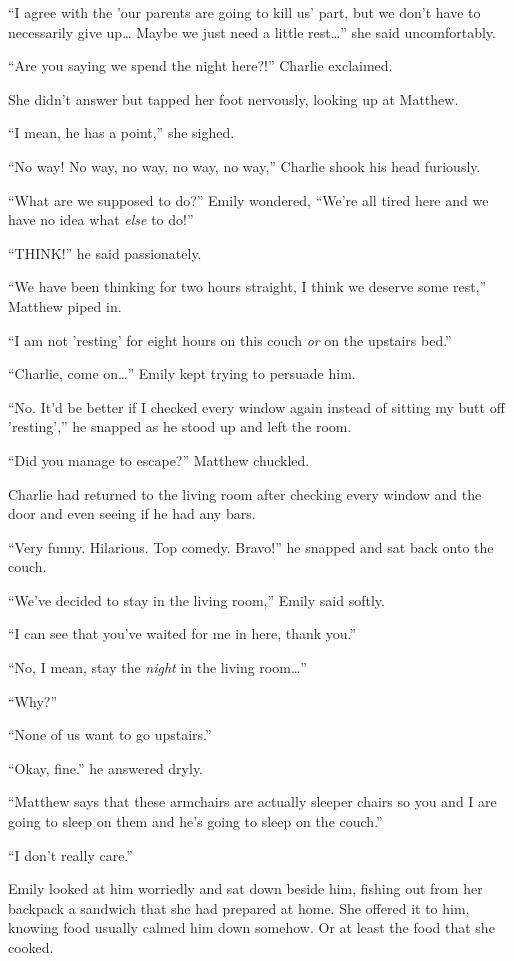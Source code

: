 “I agree with the 'our parents are going to kill us' part, but we don't have to necessarily give up… Maybe we just need a little rest…” she said uncomfortably.

“Are you saying we spend the night here?!” Charlie exclaimed.

She didn't answer but tapped her foot nervously, looking up at Matthew.

“I mean, he has a point,” she sighed.

“No way! No way, no way, no way, no way,” Charlie shook his head furiously.

“What are we supposed to do?” Emily wondered, “We're all tired here and we have no idea what \textit{else} to do!”

“THINK!” he said passionately.

“We have been thinking for two hours straight, I think we deserve some rest,” Matthew piped in.

“I am not 'resting' for eight hours on this couch \textit{or} on the upstairs bed.”

“Charlie, come on…” Emily kept trying to persuade him.

“No. It'd be better if I checked every window again instead of sitting my butt off 'resting',” he snapped as he stood up and left the room.

\bigskip

“Did you manage to escape?” Matthew chuckled.

Charlie had returned to the living room after checking every window and the door and even seeing if he had any bars.

“Very funny. Hilarious. Top comedy. Bravo!” he snapped and sat back onto the couch.

“We've decided to stay in the living room,” Emily said softly.

“I can see that you've waited for me in here, thank you.”

“No, I mean, stay the \textit{night} in the living room…”

“Why?”

“None of us want to go upstairs.”

“Okay, fine.” he answered dryly.

“Matthew says that these armchairs are actually sleeper chairs so you and I are going to sleep on them and he's going to sleep on the couch.”

“I don't really care.”

Emily looked at him worriedly and sat down beside him, fishing out from her backpack a sandwich that she had prepared at home. She offered it to him, knowing food usually calmed him down somehow. Or at least the food that she cooked.

